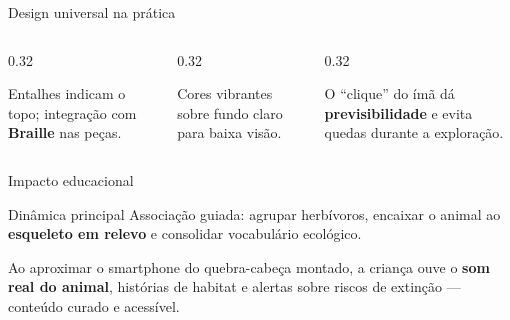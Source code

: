 \documentclass[aspectratio=169,11pt]{beamer}
\begin{document}
\begin{frame}{Design universal na prática}
  \begin{columns}[T,onlytextwidth]
    \begin{column}{0.32\textwidth}
      \begin{tcolorbox}[colback=VerdeFloresta!20,colframe=VerdeEscuro,arc=2mm,title=\textcolor{VerdeEscuro}{\textbf{Orientação tátil}}]
        \small Entalhes indicam o topo; integração com \textbf{Braille} nas peças.
      \end{tcolorbox}
    \end{column}
    \begin{column}{0.32\textwidth}
      \begin{tcolorbox}[colback=AmareloFauna!50,colframe=VerdeEscuro,arc=2mm,title=\textcolor{VerdeEscuro}{\textbf{Alto contraste}}]
        \small Cores vibrantes sobre fundo claro para baixa visão.
      \end{tcolorbox}
    \end{column}
    \begin{column}{0.32\textwidth}
      \begin{tcolorbox}[colback=VerdeCitrico!30,colframe=VerdeEscuro,arc=2mm,title=\textcolor{VerdeEscuro}{\textbf{Base magnética}}]
        \small O ``clique'' do ímã dá \textbf{previsibilidade} e evita quedas durante a exploração.
      \end{tcolorbox}
    \end{column}
  \end{columns}
\end{frame}

\begin{frame}{Impacto educacional}
  \begin{block}{Dinâmica principal}
    Associação guiada: agrupar herbívoros, encaixar o animal ao \textbf{esqueleto em relevo} e consolidar vocabulário ecológico.
  \end{block}
  \begin{fazzlehl}[title=Tecnologia de proximidade]
    Ao aproximar o smartphone do quebra-cabeça montado, a criança ouve o \textbf{som real do animal}, histórias de habitat e alertas sobre riscos de extinção --- conteúdo curado e acessível.
  \end{fazzlehl}
\end{frame}
\end{document}
